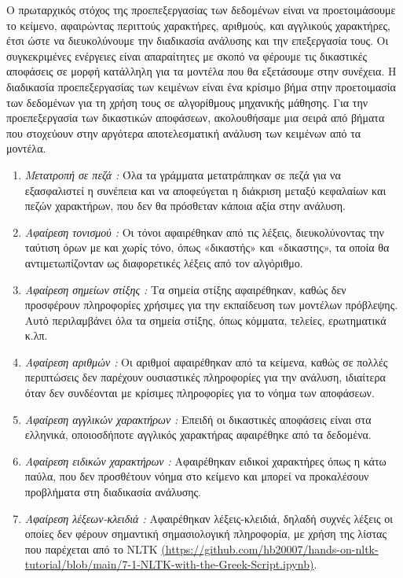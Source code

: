 \documentclass[diploma]{softlab-thesis}
\begin{document}
Ο πρωταρχικός στόχος της προεπεξεργασίας των δεδομένων είναι να προετοιμάσουμε το κείμενο, αφαιρώντας περιττούς χαρακτήρες, αριθμούς, και αγγλικούς χαρακτήρες, έτσι ώστε να διευκολύνουμε την διαδικασία ανάλυσης και την επεξεργασία τους. Οι συγκεκριμένες ενέργειες είναι απαραίτητες με σκοπό να φέρουμε τις δικαστικές αποφάσεις σε μορφή κατάλληλη για τα μοντέλα που θα εξετάσουμε στην συνέχεια. Η διαδικασία προεπεξεργασίας των κειμένων είναι ένα κρίσιμο βήμα στην προετοιμασία των δεδομένων για τη χρήση τους σε αλγορίθμους μηχανικής μάθησης. Για την προεπεξεργασία των δικαστικών αποφάσεων, ακολουθήσαμε μια σειρά από βήματα που στοχεύουν στην αργότερα αποτελεσματική ανάλυση των κειμένων από τα μοντέλα.

\begin{enumerate}
\item \textit{Μετατροπή σε πεζά :} Όλα τα γράμματα μετατράπηκαν σε πεζά για να εξασφαλιστεί η συνέπεια και να αποφεύγεται η διάκριση μεταξύ κεφαλαίων και πεζών χαρακτήρων, που δεν θα πρόσθεταν κάποια αξία στην ανάλυση.
\item \textit{Αφαίρεση τονισμού :} Οι τόνοι αφαιρέθηκαν από τις λέξεις, διευκολύνοντας την ταύτιση όρων με και χωρίς τόνο, όπως «δικαστής» και «δικαστης», τα οποία θα αντιμετωπίζονταν ως διαφορετικές λέξεις από τον αλγόριθμο.
\item \textit{Αφαίρεση σημείων στίξης :} Τα σημεία στίξης αφαιρέθηκαν, καθώς δεν προσφέρουν πληροφορίες χρήσιμες για την εκπαίδευση των μοντέλων πρόβλεψης. Αυτό περιλαμβάνει όλα τα σημεία στίξης, όπως κόμματα, τελείες, ερωτηματικά κ.λπ.
\item \textit{Αφαίρεση αριθμών :} Οι αριθμοί αφαιρέθηκαν από τα κείμενα, καθώς σε πολλές περιπτώσεις δεν παρέχουν ουσιαστικές πληροφορίες για την ανάλυση, ιδιαίτερα όταν δεν συνδέονται με κρίσιμες πληροφορίες για το νόημα των αποφάσεων.
\item \textit{Αφαίρεση αγγλικών χαρακτήρων :} Επειδή οι δικαστικές αποφάσεις είναι στα ελληνικά, οποιοσδήποτε αγγλικός χαρακτήρας αφαιρέθηκε από τα δεδομένα.
\item \textit{Αφαίρεση ειδικών χαρακτήρων :} Αφαιρέθηκαν ειδικοί χαρακτήρες όπως η κάτω παύλα, που δεν προσθέτουν νόημα στο κείμενο και μπορεί να προκαλέσουν προβλήματα στη διαδικασία ανάλυσης.
\item \textit{Αφαίρεση λέξεων-κλειδιά :} Αφαιρέθηκαν λέξεις-κλειδιά, δηλαδή συχνές λέξεις οι οποίες δεν φέρουν σημαντική σημασιολογική πληροφορία, με χρήση της λίστας που παρέχεται από το NLTK \href{https://github.com/hb20007/hands-on-nltk-tutorial/blob/main/7-1-NLTK-with-the-Greek-Script.ipynb}{(https://github.com/hb20007/hands-on-nltk-tutorial/blob/main/7-1-NLTK-with-the-Greek-Script.ipynb)}.


\end{enumerate}
\end{document}
